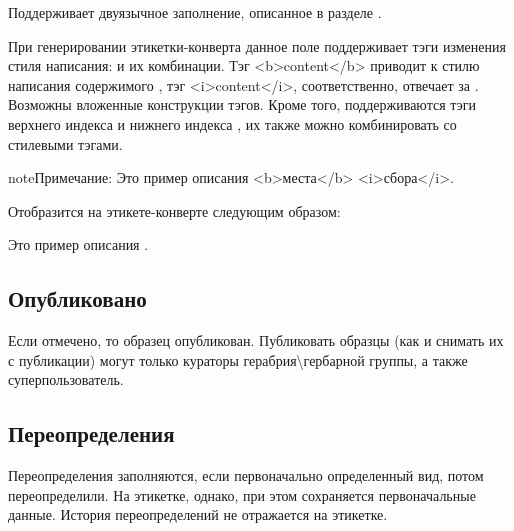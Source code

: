 \documentclass[letterpaper,10pt,russian]{sphinxmanual}
\begin{document}
Поддерживает двуязычное заполнение, описанное в разделе
{\hyperref[\detokenize{main:id14}]{}}.

При генерировании этикетки-конверта данное поле поддерживает тэги изменения
стиля написания:  и их комбинации. Тэг \textless{}b\textgreater{}content\textless{}/b\textgreater{} \textendash{}
приводит к  стилю написания содержимого ,
тэг \textless{}i\textgreater{}content\textless{}/i\textgreater{}, соответственно, отвечает за .
Возможны вложенные конструкции тэгов.
Кроме того, поддерживаются тэги верхнего индекса  и
нижнего индекса , их также можно комбинировать
со стилевыми тэгами.

\begin{sphinxadmonition}{note}{Примечание:}
Это пример описания \textless{}b\textgreater{}места\textless{}/b\textgreater{} \textless{}i\textgreater{}сбора\textless{}/i\textgreater{}.

Отобразится на этикете-конверте следующим образом:

Это пример описания  .
\end{sphinxadmonition}

\ignorespaces 

\subsection{Опубликовано}
\label{\detokenize{main:id36}}\label{\detokenize{main:index-32}}
Если отмечено, то образец опубликован.
Публиковать образцы (как и снимать их с публикации) могут
только кураторы герабрия\textbackslash{}гербарной группы,
а также суперпользователь.

\ignorespaces 

\subsection{Переопределения}
\label{\detokenize{main:index-33}}\label{\detokenize{main:id37}}
Переопределения заполняются, если первоначально определенный вид,
потом переопределили. На этикетке, однако, при этом сохраняется
первоначальные данные. История переопределений не отражается
на этикетке.
\end{document}
